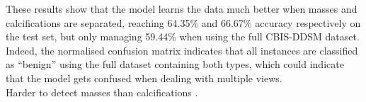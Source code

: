 


These results show that the model learns the data much better when masses and calcifications are separated, reaching 64.35\% and 66.67\% accuracy respectively on the test set, but only managing 59.44\% when using the full CBIS-DDSM dataset. Indeed, the normalised confusion matrix indicates that all instances are classified as ``benign'' using the full dataset containing both types, which could indicate that the model gets confused when dealing with multiple views.\\

Harder to detect masses than calcifications \citep{Elter2009}.
